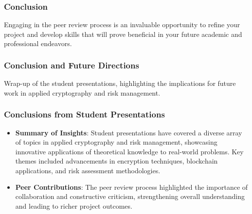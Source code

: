\documentclass{beamer}
\begin{document}
\begin{frame}[fragile]
    \frametitle{Conclusion}
    Engaging in the peer review process is an invaluable opportunity to refine your project and develop skills that will prove beneficial in your future academic and professional endeavors.
\end{frame}

\begin{frame}[fragile]
    \frametitle{Conclusion and Future Directions}
    Wrap-up of the student presentations, highlighting the implications for future work in applied cryptography and risk management.
\end{frame}

\begin{frame}[fragile]
    \frametitle{Conclusions from Student Presentations}
    
    \begin{itemize}
        \item \textbf{Summary of Insights}: 
        Student presentations have covered a diverse array of topics in applied cryptography and risk management, showcasing innovative applications of theoretical knowledge to real-world problems. Key themes included advancements in encryption techniques, blockchain applications, and risk assessment methodologies.
        
        \item \textbf{Peer Contributions}: 
        The peer review process highlighted the importance of collaboration and constructive criticism, strengthening overall understanding and leading to richer project outcomes.
    \end{itemize}
\end{frame}
\end{document}
